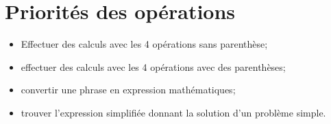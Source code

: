\chapter{Priorités des opérations}\label{ChPrioritesOperations}

\begin{acquis}
\begin{itemize}
\item Effectuer des calculs avec les 4 opérations sans parenthèse;
\item effectuer des calculs avec les 4 opérations avec des parenthèses;
\item convertir une phrase en expression mathématiques;
\item trouver l'expression simplifiée donnant la solution d'un problème simple.
\end{itemize}
\end{acquis}

\activites


\cours


\exercicesbase
\begin{colonne*exercice}

\end{colonne*exercice}


\exercicesappr
\begin{colonne*exercice}

\end{colonne*exercice}

\connaissances


\TravauxPratiques %


\pagebreak

\Recreation




